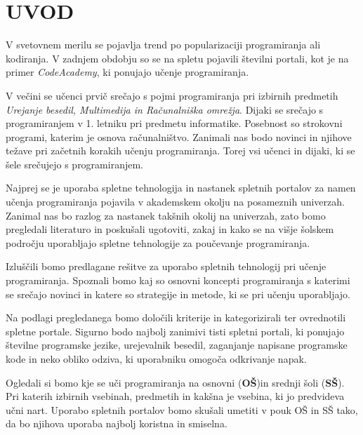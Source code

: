 \section{UVOD}
\label{sec:Uvod}


V svetovnem merilu se pojavlja trend po popularizaciji programiranja
ali kodiranja. V zadnjem obdobju so se na spletu pojavili številni
portali, kot je na primer \emph{CodeAcademy}, ki ponujajo učenje
programiranja. %


V večini se učenci prvič srečajo s pojmi programiranja pri izbirnih
predmetih \emph{Urejanje besedil, Multimedija in Računalniška
  omrežja}. Dijaki se srečajo s programiranjem v 1. letniku pri
predmetu informatike. Posebnost so strokovni programi, katerim je
osnova računalništvo. Zanimali nas bodo novinci in njihove težave pri
začetnih korakih učenju programiranja. Torej vsi učenci in dijaki, ki
se šele srečujejo s programiranjem.

Najprej se je uporaba spletne tehnologija in nastanek spletnih
portalov za namen učenja programiranja pojavila v akademskem okolju na
posameznih univerzah. Zanimal nas bo razlog za nastanek takšnih okolij
na univerzah, zato bomo pregledali literaturo in poskušali ugotoviti,
zakaj in kako se na višje šolskem področju uporabljajo spletne
tehnologije za poučevanje programiranja.

Izluščili bomo predlagane rešitve za uporabo spletnih tehnologij pri
učenje programiranja. Spoznali bomo kaj so osnovni koncepti
programiranja s katerimi se srečajo novinci in katere so strategije in
metode, ki se pri učenju uporabljajo.

Na podlagi pregledanega bomo določili kriterije in kategorizirali ter
ovrednotili spletne portale. Sigurno bodo najbolj zanimivi tisti
spletni portali, ki ponujajo številne programske jezike, urejevalnik
besedil, zaganjanje napisane programske kode in neko obliko odziva, ki
uporabniku omogoča odkrivanje napak.


Ogledali si bomo kje se uči programiranja na osnovni (\textbf{OŠ})in
srednji šoli (\textbf{SŠ}). Pri katerih izbirnih vsebinah, predmetih
in kakšna je vsebina, ki jo predvideva učni nart. Uporabo spletnih
portalov bomo skušali umetiti v pouk OŠ in SŠ tako, da bo njihova
uporaba najbolj koristna in smiselna. %


